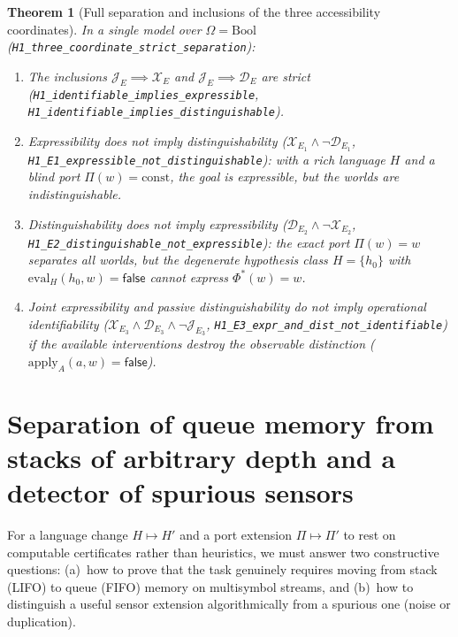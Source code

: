 \documentclass[11pt,a4paper]{article}
\theoremstyle{cleanthm}
\newtheorem{theorem}{Theorem}[section]
\DeclareRobustCommand{\id}[1]{\allowbreak\nolinkurl{#1}\allowbreak}
\begin{document}
\begin{theorem}[Full separation and inclusions of the three accessibility coordinates]
\label{thm:h1_separation}
In a single model over $\Omega=\mathrm{Bool}$ (\id{H1_three_coordinate_strict_separation}):
\begin{enumerate}
\item The inclusions $\mathcal J_E\implies\mathcal X_E$ and $\mathcal J_E\implies\mathcal D_E$ are strict (\id{H1_identifiable_implies_expressible}, \id{H1_identifiable_implies_distinguishable}).
\item Expressibility does not imply distinguishability ($\mathcal X_{E_1}\land\neg\mathcal D_{E_1}$, \id{H1_E1_expressible_not_distinguishable}): with a rich language $H$ and a blind port $\Pi(w)=\mathrm{const}$, the goal is expressible, but the worlds are indistinguishable.
\item Distinguishability does not imply expressibility ($\mathcal D_{E_2}\land\neg\mathcal X_{E_2}$, \id{H1_E2_distinguishable_not_expressible}): the exact port $\Pi(w)=w$ separates all worlds, but the degenerate hypothesis class $H=\{h_0\}$ with $\mathrm{eval}_H(h_0,w)=\mathsf{false}$ cannot express $\Phi^*(w)=w$.
\item Joint expressibility and passive distinguishability do not imply operational identifiability ($\mathcal X_{E_3}\land\mathcal D_{E_3}\land\neg\mathcal J_{E_3}$, \id{H1_E3_expr_and_dist_not_identifiable}) if the available interventions destroy the observable distinction ($\mathrm{apply}_A(a,w)=\mathsf{false}$).
\end{enumerate}
\end{theorem}

\section{Separation of queue memory from stacks of arbitrary depth and a detector of spurious sensors}
For a language change $H\mapsto H'$ and a port extension $\Pi\mapsto\Pi'$ to rest on computable certificates rather than heuristics, we must answer two constructive questions: (a)~how to prove that the task genuinely requires moving from stack (LIFO) to queue (FIFO) memory on multisymbol streams, and (b)~how to distinguish a useful sensor extension algorithmically from a spurious one (noise or duplication).
\end{document}
